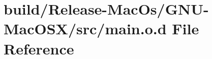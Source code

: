 \hypertarget{_release-_mac_os_2_g_n_u-_mac_o_s_x_2src_2main_8o_8d}{}\section{build/\+Release-\/\+Mac\+Os/\+G\+N\+U-\/\+Mac\+O\+S\+X/src/main.o.\+d File Reference}
\label{_release-_mac_os_2_g_n_u-_mac_o_s_x_2src_2main_8o_8d}
